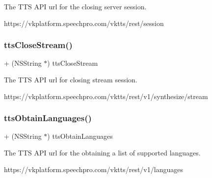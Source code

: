 The T\+TS A\+PI url for the closing server session. 
\begin{DoxyCode}
https:\textcolor{comment}{//vkplatform.speechpro.com/vktts/rest/session}
\end{DoxyCode}
 \hypertarget{interface_s_t_c_t_t_s_u_r_l_manager_a81ae15f31b07c8e2d63cedf2ebfb6f4c}{}\label{interface_s_t_c_t_t_s_u_r_l_manager_a81ae15f31b07c8e2d63cedf2ebfb6f4c} 
\subsubsection{\texorpdfstring{tts\+Close\+Stream()}{ttsCloseStream()}}
{\footnotesize\ttfamily + (N\+S\+String $\ast$) tts\+Close\+Stream \begin{DoxyParamCaption}{ }\end{DoxyParamCaption}}

The T\+TS A\+PI url for closing stream session. 
\begin{DoxyCode}
https:\textcolor{comment}{//vkplatform.speechpro.com/vktts/rest/v1/synthesize/stream}
\end{DoxyCode}
 \hypertarget{interface_s_t_c_t_t_s_u_r_l_manager_ac991b76d587aff41952f35f4d5a701a3}{}\label{interface_s_t_c_t_t_s_u_r_l_manager_ac991b76d587aff41952f35f4d5a701a3} 
\subsubsection{\texorpdfstring{tts\+Obtain\+Languages()}{ttsObtainLanguages()}}
{\footnotesize\ttfamily + (N\+S\+String $\ast$) tts\+Obtain\+Languages \begin{DoxyParamCaption}{ }\end{DoxyParamCaption}}

The T\+TS A\+PI url for the obtaining a list of supported languages. 
\begin{DoxyCode}
https:\textcolor{comment}{//vkplatform.speechpro.com/vktts/rest/v1/languages}
\end{DoxyCode}
 \hypertarget{interface_s_t_c_t_t_s_u_r_l_manager_ad7252dc739035543112f9aa103f8246e}{}\label{interface_s_t_c_t_t_s_u_r_l_manager_ad7252dc739035543112f9aa103f8246e} 

